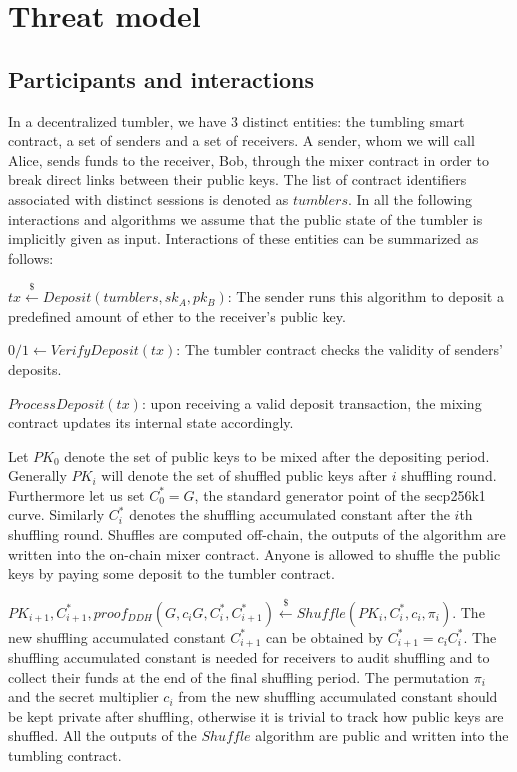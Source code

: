 \documentclass[a4paper]{article}
\theoremstyle{definition}
\begin{document}
\section{Threat model}
\subsection{Participants and interactions}
In a decentralized tumbler, we have $3$ distinct entities: the tumbling smart contract, a set of senders and a set of receivers. A sender, whom we will call Alice, sends funds to the receiver, Bob, through the mixer contract in order to break direct links between their public keys. The list of contract identifiers associated with distinct sessions is denoted as $tumblers$. In all the following interactions and algorithms we assume that the public state of the tumbler is implicitly given as input. Interactions of these entities can be summarized as follows: 
 
$tx\stackrel{\$}{\leftarrow}Deposit(tumblers,sk_A,pk_B)$: The sender runs this algorithm to deposit a predefined amount of ether to the receiver's public key.

$0/1\leftarrow VerifyDeposit(tx)$: The tumbler contract checks the validity of senders' deposits.

$ProcessDeposit(tx)$: upon receiving a valid deposit transaction, the mixing contract updates its internal state accordingly.

Let $PK_{0}$ denote the set of public keys to be mixed after the depositing period. Generally $PK_{i}$ will denote the set of shuffled public keys after $i$ shuffling round. Furthermore let us set $C^{*}_{0}=G$, the standard generator point of the secp256k1 curve. Similarly $C^{*}_{i}$ denotes the shuffling accumulated constant after the $i$th shuffling round. Shuffles are computed off-chain, the outputs of the algorithm are written into the on-chain mixer contract. Anyone is allowed to shuffle the public keys by paying some deposit to the tumbler contract.

$PK_{i+1},C_{i+1}^{*},proof_{DDH}(G,c_{i}G,C^{*}_{i},C^{*}_{i+1})\stackrel{\$}{\leftarrow}Shuffle(PK_{i},C^{*}_{i},c_{i},\pi_{i})$. The new shuffling accumulated constant $C^{*}_{i+1}$ can be obtained by $C^{*}_{i+1}=c_{i}C^{*}_{i}$. The shuffling accumulated constant is needed for receivers to audit shuffling and to collect their funds at the end of the final shuffling period. The permutation $\pi_{i}$ and the secret multiplier $c_{i}$ from the new shuffling accumulated constant should be kept private after shuffling, otherwise it is trivial to track how public keys are shuffled. All the outputs of the $Shuffle$ algorithm are public and written into the tumbling contract.
\end{document}
